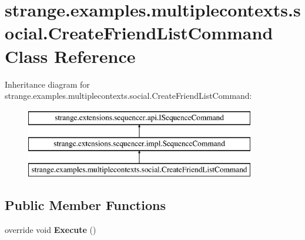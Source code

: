 \hypertarget{classstrange_1_1examples_1_1multiplecontexts_1_1social_1_1_create_friend_list_command}{\section{strange.\-examples.\-multiplecontexts.\-social.\-Create\-Friend\-List\-Command Class Reference}
\label{classstrange_1_1examples_1_1multiplecontexts_1_1social_1_1_create_friend_list_command}
}
Inheritance diagram for strange.\-examples.\-multiplecontexts.\-social.\-Create\-Friend\-List\-Command\-:\begin{figure}[H]
\begin{center}
\leavevmode
\includegraphics[height=3.000000cm]{classstrange_1_1examples_1_1multiplecontexts_1_1social_1_1_create_friend_list_command}
\end{center}
\end{figure}
\subsection*{Public Member Functions}
\begin{DoxyCompactItemize}
\item 
\hypertarget{classstrange_1_1examples_1_1multiplecontexts_1_1social_1_1_create_friend_list_command_aade1651c32a8b9af15d9a1723269bfb6}{override void {\bfseries Execute} ()}\label{classstrange_1_1examples_1_1multiplecontexts_1_1social_1_1_create_friend_list_command_aade1651c32a8b9af15d9a1723269bfb6}

\end{DoxyCompactItemize}
